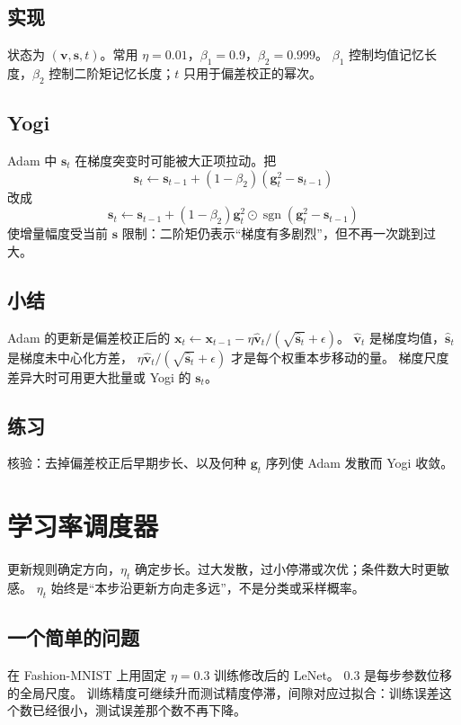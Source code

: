 \subsection{实现}

状态为 $(\bm{v},\bm{s},t)$。常用 $\eta=0.01$，$\beta_1=0.9$，$\beta_2=0.999$。
$\beta_1$ 控制均值记忆长度，$\beta_2$ 控制二阶矩记忆长度；$t$ 只用于偏差校正的幂次。

\subsection{Yogi}

Adam 中 $\bm{s}_t$ 在梯度突变时可能被大正项拉动。把
\[
\bm{s}_t\leftarrow\bm{s}_{t-1}+(1-\beta_2)(\bm{g}_t^2-\bm{s}_{t-1})
\]
改成
\[
\bm{s}_t
\leftarrow
\bm{s}_{t-1}+(1-\beta_2)\bm{g}_t^2\odot\operatorname{sgn}(\bm{g}_t^2-\bm{s}_{t-1})
\]
使增量幅度受当前 $\bm{s}$ 限制：二阶矩仍表示“梯度有多剧烈”，但不再一次跳到过大。

\subsection{小结}

Adam 的更新是偏差校正后的
$\bm{x}_t\leftarrow\bm{x}_{t-1}-\eta\hat{\bm{v}}_t/(\sqrt{\hat{\bm{s}}_t}+\epsilon)$。
$\hat{\bm{v}}_t$ 是梯度均值，$\hat{\bm{s}}_t$ 是梯度未中心化方差，
$\eta\hat{\bm{v}}_t/(\sqrt{\hat{\bm{s}}_t}+\epsilon)$ 才是每个权重本步移动的量。
梯度尺度差异大时可用更大批量或 Yogi 的 $\bm{s}_t$。

\subsection{练习}

核验：去掉偏差校正后早期步长、以及何种 $\bm{g}_t$ 序列使 Adam 发散而 Yogi 收敛。

\section{学习率调度器}

更新规则确定方向，$\eta_t$ 确定步长。过大发散，过小停滞或次优；条件数大时更敏感。
$\eta_t$ 始终是“本步沿更新方向走多远”，不是分类或采样概率。

\subsection{一个简单的问题}

在 Fashion-MNIST 上用固定 $\eta=0.3$ 训练修改后的 LeNet。
$0.3$ 是每步参数位移的全局尺度。
训练精度可继续升而测试精度停滞，间隙对应过拟合：训练误差这个数已经很小，测试误差那个数不再下降。

